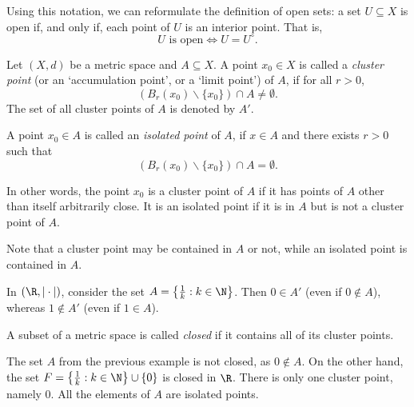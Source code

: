 \begin{remark}
Using this notation, we can reformulate the definition of open sets: a set
$U \subseteq X$ is open if, and only if, each point of $U$ is an interior point.
That is,
\[
U \mbox{ is open} \Leftrightarrow U = U^\circ.
\]
\end{remark}





\np

\begin{definition}
Let $(X,d)$ be a metric space and $A \subseteq X$. A point $x_0 \in X$ is
called a \emph{cluster point} (or an `accumulation point', or a `limit point') of $A$, if for all
$r > 0$,
\[
(B_r(x_0) \backslash \{x_0\}) \cap A \not= \emptyset.
\]
The set of all cluster points of $A$ is denoted by $A'$.


A point $x_0 \in A$ is called an \emph{isolated point} of $A$, if $x\in A$ and there exists $r > 0$ such that
\[
(B_r(x_0) \backslash \{x_0\}) \cap A  = \emptyset.
\]

\end{definition}

In other words, the point $x_0$ is a cluster point of $A$ if it has points
of $A$ other than itself arbitrarily close. It is an isolated point if it is in $A$ but is not a cluster point of $A$.

Note that a cluster point may be contained in $A$ or not, while an isolated point is contained in $A$.




\begin{example}
In $(\R, |\cdot|)$, consider the set $A = \left\{\frac{1}{k}: k \in \N\right\}$. Then $0 \in A'$ (even if $0\notin A$), whereas $1 \not\in A'$ (even if $1\in A$).
\end{example}

\begin{definition}
A subset of a metric space is called \emph{closed} if it contains
all of its cluster points.
\end{definition}

\begin{example}
The set $A$ from the previous example is not closed, as $0 \not\in A$.
On the other hand, the set $F = \left\{\frac{1}{k}: k \in \N\right\} \cup \{0\}$ is closed in $\R$.
There is only one cluster point, namely $0$. All the elements of $A$ are isolated points.
\end{example}


